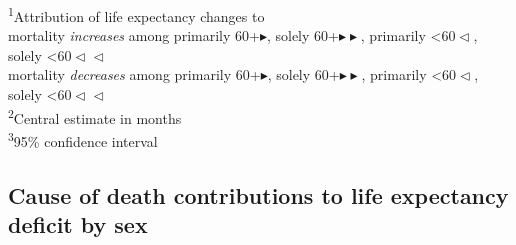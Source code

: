 \documentclass[12pt]{article}
\begin{document}
\begin{table}[ht]
\begin{tabular}
\bottomrule
\end{tabular}
\vspace{-5mm}
\begin{minipage}{\linewidth}
\textsuperscript{1}Attribution of life expectancy changes to \\
mortality \emph{increases} among {\color{negativesig}primarily 60+$\blacktriangleright$}, {\color{negativesig}solely 60+$\blacktriangleright\blacktriangleright$}, {\color{negativesig}primarily \textless{}60$\vartriangleleft$}, {\color{negativesig}solely \textless{}60$\vartriangleleft\vartriangleleft$} \\
mortality \emph{decreases} among {\color{positivesig}primarily 60+$\blacktriangleright$}, {\color{positivesig}solely 60+$\blacktriangleright\blacktriangleright$}, {\color{positivesig}primarily \textless{}60$\vartriangleleft$}, {\color{positivesig}solely \textless{}60$\vartriangleleft\vartriangleleft$} \\
\textsuperscript{2}Central estimate in months \\
\textsuperscript{3}95\% confidence interval \\
\end{minipage}
\caption{Months of male life expectancy (LE) changes and deficits (labelled ES) since the start of the pandemic attributed to age-specific mortality changes (labelled AT). LE deficit is defined as observed minus expected life expectancy had pre-pandemic mortality trends continued.}
\label{tab:table-a2}
\end{table}

\clearpage

\subsection*{Cause of death contributions to life expectancy deficit by sex}
\end{document}
